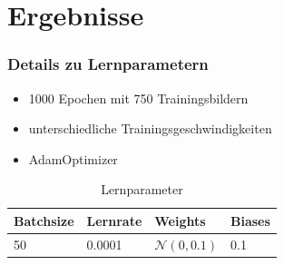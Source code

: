 \documentclass{beamer}
\begin{document}
\section{Ergebnisse}
\begin{frame}
	\frametitle{Details zu Lernparametern}
	\begin{itemize} 		
		\item 1000 Epochen mit 750 Trainingsbildern
		\item unterschiedliche Trainingsgeschwindigkeiten
		\item AdamOptimizer
	\end{itemize}
	\begin{table}
		\begin{tabular}{l l l l}
			\toprule
			\textbf{Batchsize} & \textbf{Lernrate} & \textbf{Weights} & \textbf{Biases}\\
			\midrule
			50 &  0.0001 & \( \mathcal{N}(0,0.1) \) & 0.1\\
			
			\bottomrule
		\end{tabular}
		\caption{Lernparameter}
	\end{table}
\end{frame}
\end{document}
